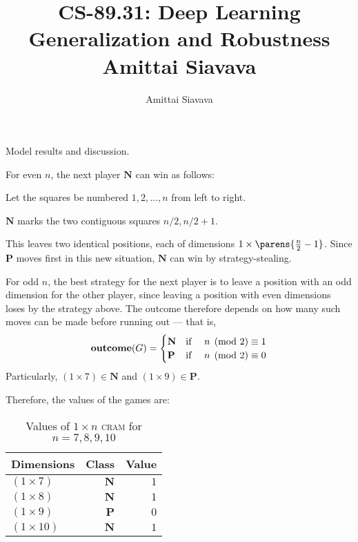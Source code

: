 \documentclass[11pt, reqno]{amsart}
\begin{document}

\title{CS-89.31: Deep Learning Generalization and Robustness\\ Amittai Siavava \\ }
\author{Amittai Siavava}


\setlength{\headheight}{13.0pt}
\setlength{\footskip}{15.0pt}

\maketitle

\bigskip

\def \cram { \textsc{cram} }
\def \dom { \textsc{domineering} }
\def \sub { \textsc{subtraction} }
\def \weighted { \textsc{weighted odds and evens}}
\def \nim { \textsc{nim} }
\def \P { \mathbf{P}}
\def \N { \mathbf{N}}

\newpage
\begin{problem}[1]
  Model results and discussion.

  \step
  For even $n$, the next player $\N$ can win as follows:
  \begin{enumroman}
    \item Let the squares be numbered $1, 2, \ldots, n$ from left to right.
    \item $\N$ marks the two contiguous squares $n/2, n/2 + 1$.
    \item This leaves two identical positions, each of dimensions
      $1 \times \parens{\frac{n}{2} - 1}$.
      Since $\P$ moves first in this new situation, $\N$ can win by strategy-stealing.
  \end{enumroman}
  
  \step
  For odd $n$, the best strategy for the next player is to leave a position with an odd
  dimension for the other player, since leaving a position with even dimensions
  loses by the strategy above.
  The outcome therefore depends on how many such moves can be made before running out
  --- that is,
  \[ \mathbf{outcome}(G) = \begin{cases}
      \N & \text{if \quad $n \pmod 2 \equiv 1$} \\
      \P & \text{if \quad $n \pmod 2 \equiv 0$}
  \end{cases} \]
  Particularly, $(1 \times 7) \in \N$ and $(1 \times 9) \in \P$.

  \step
  Therefore, the values of the games are:
  \begin{table}[h]
    \centering
    \begin{tabular}{|l|r|r|}
      Dimensions & Class & Value \\
      \bottomrule
      $(1 \times 7)$ & $\N$ & $1$ \\
      $(1 \times 8)$ & $\N$ & $1$ \\
      $(1 \times 9)$ & $\P$ & $0$ \\
      $(1 \times 10)$ & $\N$ & $1$ \\
      \toprule
    \end{tabular}
    \caption{Values of $1 \times n$ \cram for $n = 7, 8, 9, 10$}
  \end{table}
\end{problem}
\end{document}
